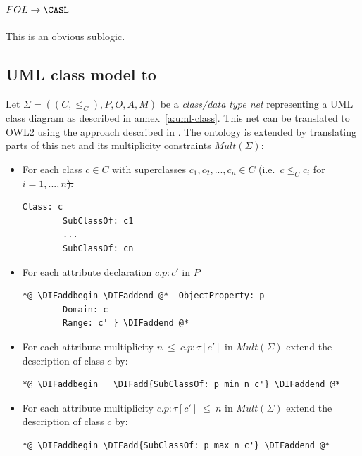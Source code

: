 \documentclass[10pt,fleqn,final]{scrreprt}
\newcommand{\ssclause}[1]{\subsection{#1}}
\newenvironment{definitions}[0]{\medskip }{}
\providecommand{\DIFadd}[1]{{\protect\color{blue}\uwave{#1}}} %
\providecommand{\DIFdel}[1]{{\protect\color{red}\sout{#1}}}                      %
\providecommand{\DIFaddbegin}{} %
\providecommand{\DIFaddend}{} %
\providecommand{\DIFdelbegin}{} %
\providecommand{\DIFdelend}{} %
\begin{document}
\begin{definitions}
\ssclause{$FOL \to \CASL$}
This is an obvious sublogic.

 

\DIFdelbegin %
\DIFdelend \DIFaddbegin \ssclause{UML class model to \OWL}
\DIFaddend Let $\Sigma = ((C, {\leq_C}), P, O, A, M)$ be a \emph{class/data type net} representing a UML 
class \DIFdelbegin \DIFdel{diagram }\DIFdelend \DIFaddbegin \DIFadd{model }\DIFaddend as described in annex~\ref{a:uml-class}. This net can be translated to OWL2 using the approach described in \cite{zedlitz2012uml}.
The ontology is extended by translating parts of this net and its multiplicity constraints $\mathit{Mult}(\Sigma)$:
\begin{itemize}
\item For each class $c \in C$ with superclasses \DIFdelbegin \DIFdel{$c_1,c_2,...,c_n \in C$ }\DIFdelend \DIFaddbegin \DIFadd{$c_1,c_2,\ldots,c_n \in C$ }\DIFaddend (i.e.\ $c \leq_C c_i$ for \DIFdelbegin \DIFdel{$i=1,...,n$):} \DIFdelend
\DIFaddbegin \DIFadd{$i=1,\ldots,n$):} \DIFaddend
{}
\begin{lstlisting}[language=owl2Manchester]
		    Class: c
		SubClassOf: c1
		...
		SubClassOf: cn
\end{lstlisting}
\item For each attribute declaration $c.p:c'$ in $P$
\begin{lstlisting}[language=owl2Manchester]
	*@ \DIFaddbegin \DIFaddend @*  ObjectProperty: p
		Domain: c
		Range: c' } \DIFaddend @*
\end{lstlisting}

\item For each attribute multiplicity $n\ \mathsf{\leq}\ c.p:\tau[c']$ in $\mathit{Mult}(\Sigma)$ extend the description of class $c$ by:
\begin{lstlisting}[language=owl2Manchester]
	*@ \DIFaddbegin   \DIFadd{SubClassOf: p min n c'} \DIFaddend @*
\end{lstlisting}

\item For each attribute multiplicity $ c.p:\tau[c'] \ \mathsf{\leq}\ n$  in $\mathit{Mult}(\Sigma)$ extend the description of class $c$ by:
 \begin{lstlisting}[language=owl2Manchester]
	*@ \DIFaddbegin \DIFadd{SubClassOf: p max n c'} \DIFaddend @*
\end{lstlisting}


\end{itemize}
\end{definitions}
\end{document}
